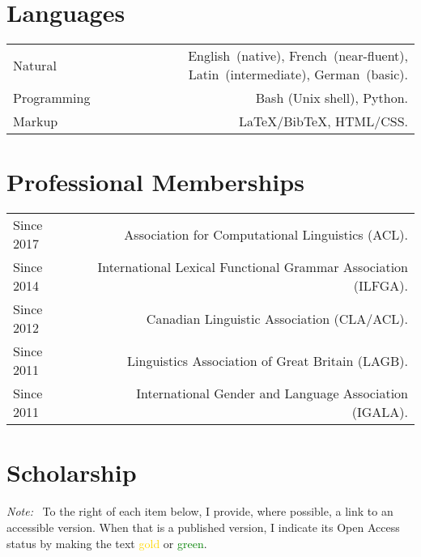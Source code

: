 \documentclass[11pt,a4paper]{article}
\makeatletter
\newenvironment{cvsection}{%
  \setlength{\extrarowheight}{0.70ex}
  \begin{longtable}[l]{@{} L R @{}}
}{%
  \end{longtable}
}
\newcommand{\note}{\emph{Note: }}
\newcommand{\Label}[1]{%
\textnormal{#1}%
}
\makeatother
\begin{document}
\section*{Languages}

\begin{cvsection}
  \Label{Natural}      & English~(native), French~(near-fluent),
                          Latin~(intermediate), German~(basic). \\
  \Label{Programming}  & Bash (Unix shell), Python. \\
  \Label{Markup}       & \LaTeX*\slash Bib\TeX*, HTML\slash CSS.
\end{cvsection}


\section*{Professional Memberships}

\begin{cvsection}
  Since 2017	& Association for Computational Linguistics (ACL).\\
  Since 2014    & International Lexical Functional Grammar Association (ILFGA).\\
  Since 2012 	& Canadian Linguistic Association (CLA\slash ACL).\\
  Since 2011 	& Linguistics Association of Great Britain (LAGB).\\
  Since 2011 	& International Gender and Language Association (IGALA).\\
\end{cvsection}


\newpage
{}


\section*{Scholarship} \label{scholarship}

\note\ To the right of each item below, I provide, where possible, a link to an accessible version. When that is a published version, I indicate its Open Access status by making the text \textcolor{gold}{gold} or \textcolor{green}{green}.
\end{document}
